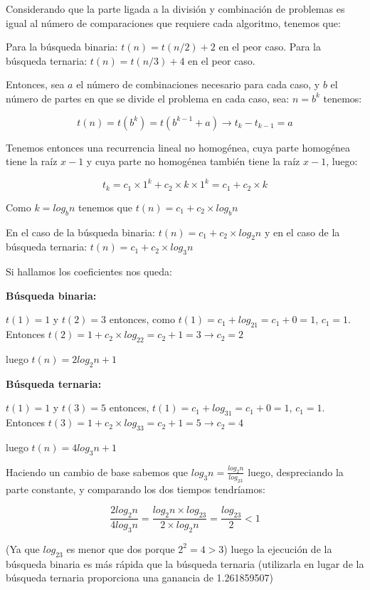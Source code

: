 \documentclass[a4paper, 11pt]{article}
\begin{document}
	
		
		
		Considerando que la parte ligada a la división y combinación de problemas es igual al número de comparaciones que requiere cada algoritmo, tenemos que:
		
		Para la búsqueda binaria: $t(n)=t(n/2)+2$ en el peor caso.
		Para la búsqueda ternaria: $t(n)=t(n/3)+4$ en el peor caso.
		
		Entonces, sea $a$ el número de combinaciones necesario para cada caso, y $b$ el número de partes en que se divide el problema en cada caso, sea: $n=b^k$ tenemos:
		
		$$t(n)=t(b^k)=t(b^{k-1}+a)\rightarrow t_k - t_{k-1} = a$$
		
 Tenemos entonces una recurrencia lineal no homogénea, cuya parte homogénea tiene la raíz $x-1$ y cuya parte no homogénea también tiene la raíz $x-1$, luego:
		
		$$t_k = c_1\times 1^{k} + c_2\times k \times 1^k = c_1 + c_2 \times k$$
		
		Como $k=log_bn$ tenemos que $t(n) = c_1 + c_2 \times log_bn$ 
		
		En el caso de la búsqueda binaria: $t(n) = c_1 + c_2 \times log_2n$ y en el caso de la búsqueda ternaria: $t(n) = c_1 + c_2 \times log_3n$ 
		
		Si hallamos los coeficientes nos queda:
		
		\textbf{Búsqueda binaria:}
		
		$t(1)=1$ y $t(2)=3$ entonces, como $t(1)=c_1+log_21=c_1+0=1$, $c_1=1$. Entonces $t(2)=1+c_2\times log_22 = c_2+1 = 3\rightarrow c_2 = 2$
		
		luego $t(n) = 2log_2n + 1$
		
		\textbf{Búsqueda ternaria:}
		
		$t(1)=1$ y $t(3)=5$ entonces, $t(1)=c_1+log_31=c_1+0=1$, $c_1=1$. Entonces $t(3)=1+c_2 \times log_33 = c_2+1 = 5 \rightarrow c_2 = 4$ 
		
		luego $t(n) = 4log_3n + 1$
		
		Haciendo un cambio de base sabemos que $log_3n=\frac{log_2n}{log_23}$ luego, despreciando la parte constante, y comparando los dos tiempos tendríamos:
		
		$$\frac{2log_2n}{4log_3n}=\frac{log_2n \times log_23}{2 \times log_2n}=\frac{log_23}{2}<1$$
		
		(Ya que $log_23$ es menor que dos porque $2^2=4>3$) luego la ejecución de la búsqueda binaria es más rápida que la búsqueda ternaria (utilizarla en lugar de la búsqueda ternaria proporciona una ganancia de 1.261859507)
		
\end{document}
